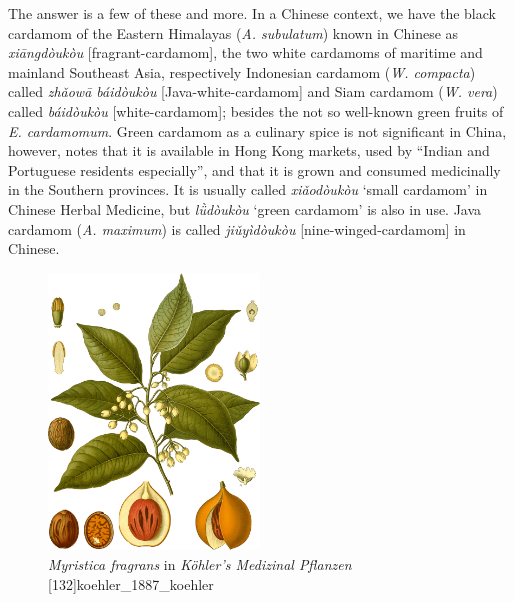 \documentclass[12pt]{article}
\begin{document}

The answer is a few of these and more. In a Chinese context, we have the black cardamom of the Eastern Himalayas (\textit{A. subulatum}) known in Chinese as \textit{xiāngdòukòu} [fragrant-cardamom], the two white cardamoms of maritime and mainland Southeast Asia, respectively Indonesian cardamom (\textit{W. compacta}) called \textit{zhǎowā
báidòukòu} [Java-white-cardamom] and Siam cardamom (\textit{W. vera}) called \textit{báidòukòu} [white-cardamom]; besides the not so well-known green fruits of \textit{E. cardamomum}. Green cardamom as a culinary spice is not significant in China, however, \textcite{hu_2005_food} notes that it is available in Hong Kong markets, used by ``Indian and Portuguese residents especially'', and that it is grown and consumed medicinally in the Southern provinces. It is usually called \textit{xiǎodòukòu} `small cardamom' in Chinese Herbal Medicine, but \textit{lǜdòukòu} `green cardamom' is also in use. Java cardamom (\textit{A. maximum}) is called \textit{jiǔyìdòukòu} [nine-winged-cardamom] in Chinese. 


\begin{figure}
    \centering
    \includegraphics[width=0.5\textwidth]{imgs/nutmeg.png}
    \caption{\textit{Myristica fragrans} in \textit{Köhler's Medizinal Pflanzen} [132]{koehler_1887_koehler}}
    \label{fig:nutmeg}
\end{figure}
\end{document}
